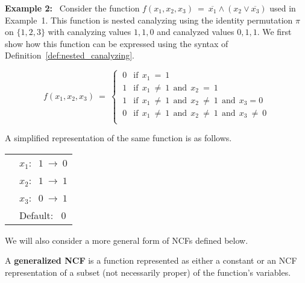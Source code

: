 \medskip
\noindent
\textbf{Example 2:}~ Consider the function 
$f(x_1, x_2, x_3) ~=~ \overline{x_1} \wedge (x_2 \vee \overline{x_3})$
used in Example~1.
This function is nested canalyzing using the identity permutation $\pi$ on $\{1,2,3\}$
with canalyzing values $1,1,0$ and canalyzed values $0, 1, 1$.
We first show how this function can be expressed using the syntax of
Definition~\ref{def:nested_canalyzing}.

\[
f(x_1, x_2, x_3) ~=~ 
   \begin{cases}
       \:0 & \mathrm{if~~} x_{1} ~=~ 1 \\
       \:1 & \mathrm{if~~} x_{1} ~\neq~ 1 \mathrm{~~and~~}
            x_{2} ~=~ 1 \\
       \:1 & \mathrm{if~~} x_{1} ~\neq~ 1 \mathrm{~~and~~}
            x_{2} ~\neq~ 1 \mathrm{~~and~~} x_{3} = 0 \\
       \:0 & \mathrm{if~~} x_{1} ~\neq~ 1 \mathrm{~~and~~}
            x_{2} ~\neq~ 1 \mathrm{~~and~~} x_{3} ~\neq~ 0 \\
   \end{cases}
\]

\medskip
\noindent
A simplified representation of the same function is as follows.

\bigskip

\noindent
\begin{tabular}{ll}
\hspace*{1.1in} & $x_1:~$  $1 ~\longrightarrow~ 0$ \\ [1ex]
\hspace*{1.1in} & $x_2:~$  $1 ~\longrightarrow~ 1$ \\ [1ex]
\hspace*{1.1in} & $x_3:~$  $0 ~\longrightarrow~ 1$ \\ [1ex]
\hspace*{1.1in} & Default:~ $0$ \\
\end{tabular}

\noindent

\iffalse
\noindent
We will also consider a more general form of NCFs defined below.

\begin{definition}\label{def:generalized ncf}
A {\bf generalized NCF} is a function represented as either a constant
or an NCF representation of a subset (not necessarily proper) 
of the function's variables.
\end{definition}

